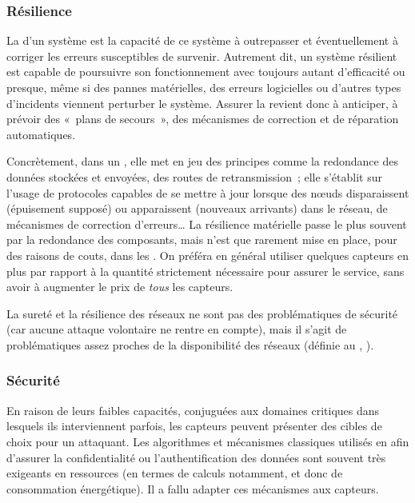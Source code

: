         \subsubsection{Résilience}
La \resilience d'un système est la capacité de ce système à outrepasser et éventuellement à corriger les erreurs susceptibles de survenir.
Autrement dit, un système résilient est capable de poursuivre son fonctionnement avec toujours autant d'efficacité ou presque, même si des pannes matérielles, des erreurs logicielles ou d'autres types d'incidents viennent perturber le système.
Assurer la \resilience revient donc à anticiper, à prévoir des « plans de secours », des mécanismes de correction et de réparation automatiques.

Concrètement, dans un \rcsfs, elle met en jeu des principes comme la redondance des données stockées et envoyées, des routes de retransmission~\cite{SP10}; elle s'établit sur l'usage de protocoles capables de se mettre à jour lorsque des nœuds disparaissent (épuisement supposé) ou apparaissent (nouveaux arrivants) dans le réseau, de mécanismes de correction d'erreurs…
La résilience matérielle passe le plus souvent par la redondance des composants, mais n'est que rarement mise en place, pour des raisons de couts, dans les \rcs.
On préféra en général utiliser quelques capteurs en plus par rapport à la quantité strictement nécessaire pour assurer le service, sans avoir à augmenter le prix de \emph{tous} les capteurs.

La sureté et la résilience des réseaux ne sont pas des problématiques de sécurité (car aucune attaque volontaire ne rentre en compte), mais il s'agit de problématiques assez proches de la disponibilité des réseaux (définie au , ).

        \subsubsection{Sécurité}
En raison de leurs faibles capacités, conjuguées aux domaines critiques dans lesquels ils interviennent parfois, les capteurs peuvent présenter des cibles de choix pour un attaquant.
Les algorithmes et mécanismes classiques utilisés en  afin d'assurer la confidentialité ou l'authentification des données sont souvent très exigeants en ressources (en termes de calculs notamment, et donc de consommation énergétique).
Il a fallu adapter ces mécanismes aux capteurs.


